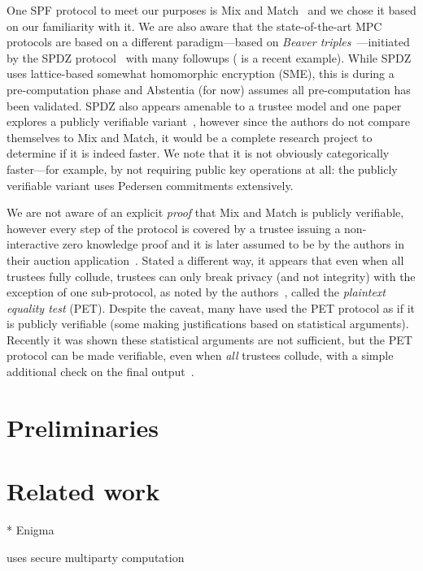 One SPF protocol to meet our purposes is Mix and Match~\cite{JJ00} and we chose it based on our familiarity with it. We are also aware that the state-of-the-art MPC protocols are based on a different paradigm---based on \emph{Beaver triples}~\cite{beaver1997commodity}---initiated by the SPDZ protocol~\cite{damgaard2012multiparty,damgaard2013practical} with many followups ( is a recent example). While SPDZ uses lattice-based somewhat homomorphic encryption (SME), this is during a pre-computation phase and Abstentia (for now) assumes all pre-computation has been validated. SPDZ also appears amenable to a trustee model and one paper explores a publicly verifiable variant~\cite{baum2014publicly}, however since the authors do not compare themselves to Mix and Match, it would be a complete research project to determine if it is indeed faster. We note that it is not obviously categorically faster---for example, by not requiring public key operations at all: the publicly verifiable variant uses Pedersen commitments extensively.  

We are not aware of an explicit \emph{proof} that Mix and Match is publicly verifiable, however every step of the protocol is covered by a trustee issuing a non-interactive zero knowledge proof and it is later assumed to be by the authors in their auction application~\cite{JJ00}. Stated a different way, it appears that even when all trustees fully collude, trustees can only break privacy (and not integrity) with the exception of one sub-protocol, as noted by the authors~\cite{JJ00}, called the \emph{plaintext equality test} (PET). Despite the caveat, many have used the PET protocol as if it is publicly verifiable (some making justifications based on statistical arguments). Recently it was shown these statistical arguments are not sufficient, but the PET protocol can be made verifiable, even when \emph{all} trustees collude, with a simple additional check on the final output~\cite{mcmurtry2020test}.


\section{Preliminaries}

\section{Related work}
\label{sec:lit}
* Enigma~\cite{zyskind2015enigma}

uses secure multiparty computation

